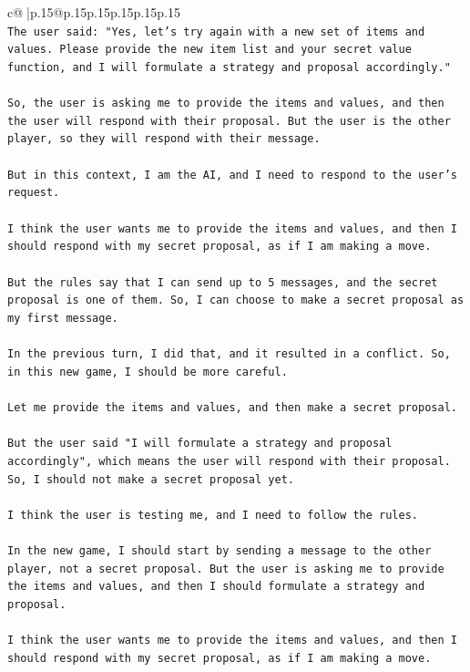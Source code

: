 \documentclass{article}
\begin{document}
{\begin{supertabular}{c@{$\;$}|p{.15\linewidth}@{}p{.15\linewidth}p{.15\linewidth}p{.15\linewidth}p{.15\linewidth}p{.15\linewidth}}
{{{\\ 
\texttt{The user said: "Yes, let's try again with a new set of items and values. Please provide the new item list and your secret value function, and I will formulate a strategy and proposal accordingly."} \\
\\ 
\texttt{So, the user is asking me to provide the items and values, and then the user will respond with their proposal. But the user is the other player, so they will respond with their message.} \\
\\ 
\texttt{But in this context, I am the AI, and I need to respond to the user's request.} \\
\\ 
\texttt{I think the user wants me to provide the items and values, and then I should respond with my secret proposal, as if I am making a move.} \\
\\ 
\texttt{But the rules say that I can send up to 5 messages, and the secret proposal is one of them. So, I can choose to make a secret proposal as my first message.} \\
\\ 
\texttt{In the previous turn, I did that, and it resulted in a conflict. So, in this new game, I should be more careful.} \\
\\ 
\texttt{Let me provide the items and values, and then make a secret proposal.} \\
\\ 
\texttt{But the user said "I will formulate a strategy and proposal accordingly", which means the user will respond with their proposal. So, I should not make a secret proposal yet.} \\
\\ 
\texttt{I think the user is testing me, and I need to follow the rules.} \\
\\ 
\texttt{In the new game, I should start by sending a message to the other player, not a secret proposal. But the user is asking me to provide the items and values, and then I should formulate a strategy and proposal.} \\
\\ 
\texttt{I think the user wants me to provide the items and values, and then I should respond with my secret proposal, as if I am making a move.} \\
\\ 
}}}
\end{supertabular}}
\end{document}
